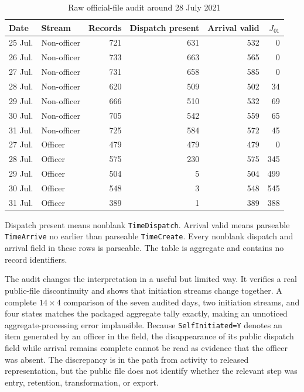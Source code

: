\documentclass[11pt]{article}
\begin{document}
\begin{table}[t]
\centering
\caption{Raw official-file audit around 28 July 2021}
\label{tab:rawbreak}
\begin{tabular}{@{}llrrrr@{}}
\toprule
Date & Stream & Records & Dispatch present & Arrival valid & $J_{01}$ \\
\midrule
25 Jul. & Non-officer & 721 & 631 & 532 & 0 \\
26 Jul. & Non-officer & 733 & 663 & 565 & 0 \\
27 Jul. & Non-officer & 731 & 658 & 585 & 0 \\
28 Jul. & Non-officer & 620 & 509 & 502 & 34 \\
29 Jul. & Non-officer & 666 & 510 & 532 & 69 \\
30 Jul. & Non-officer & 705 & 542 & 559 & 65 \\
31 Jul. & Non-officer & 725 & 584 & 572 & 45 \\
\midrule
27 Jul. & Officer & 479 & 479 & 479 & 0 \\
28 Jul. & Officer & 575 & 230 & 575 & 345 \\
29 Jul. & Officer & 504 & 5 & 504 & 499 \\
30 Jul. & Officer & 548 & 3 & 548 & 545 \\
31 Jul. & Officer & 389 & 1 & 389 & 388 \\
\bottomrule
\end{tabular}
\begin{minipage}{0.96\textwidth}\footnotesize
Dispatch present means nonblank \texttt{TimeDispatch}. Arrival valid means parseable \texttt{TimeArrive} no earlier than parseable \texttt{TimeCreate}. Every nonblank dispatch and arrival field in these rows is parseable. The table is aggregate and contains no record identifiers.
\end{minipage}
\end{table}

The audit changes the interpretation in a useful but limited way. It verifies a real public-file discontinuity and shows that initiation streams change together. A complete $14\times4$ comparison of the seven audited days, two initiation streams, and four states matches the packaged aggregate tally exactly, making an unnoticed aggregate-processing error implausible. Because \texttt{SelfInitiated=Y} denotes an item generated by an officer in the field, the disappearance of its public dispatch field while arrival remains complete cannot be read as evidence that the officer was absent. The discrepancy is in the path from activity to released representation, but the public file does not identify whether the relevant step was entry, retention, transformation, or export.
\end{document}
